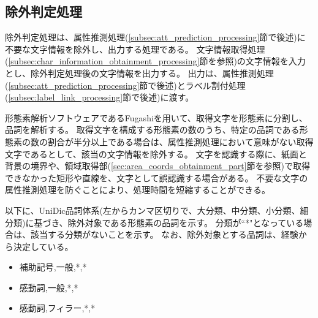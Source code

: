 \subsection{除外判定処理}\label{subsec:exclusion_judgement_processing}
除外判定処理は、属性推測処理(\ref{subsec:att_prediction_processing}節で後述)に不要な文字情報を除外し、出力する処理である。
文字情報取得処理(\ref{subsec:char_information_obtainment_processing}節を参照)の文字情報を入力とし、除外判定処理後の文字情報を出力する。
出力は、属性推測処理(\ref{subsec:att_prediction_processing}節で後述)とラベル割付処理(\ref{subsec:label_link_processing}節で後述)に渡す。

形態素解析ソフトウェアであるFugashiを用いて、取得文字を形態素に分割し、品詞を解析する。
取得文字を構成する形態素の数のうち、特定の品詞である形態素の数の割合が半分以上である場合は、属性推測処理において意味がない取得文字であるとして、該当の文字情報を除外する。
文字を認識する際に、紙面と背景の境界や、領域取得部(\ref{sec:area_coords_obtainment_part}節を参照)で取得できなかった矩形や直線を、文字として誤認識する場合がある。
不要な文字の属性推測処理を防ぐことにより、処理時間を短縮することができる。

以下に、UniDic品詞体系(左からカンマ区切りで、大分類、中分類、小分類、細分類)に基づき、除外対象である形態素の品詞を示す。
分類が``*"となっている場合は、該当する分類がないことを示す。
なお、除外対象とする品詞は、経験から決定している。

\begin{itemize}
    \item 補助記号,一般,*,*
    \item 感動詞,一般,*,*
    \item 感動詞,フィラー,*,*
\end{itemize}

